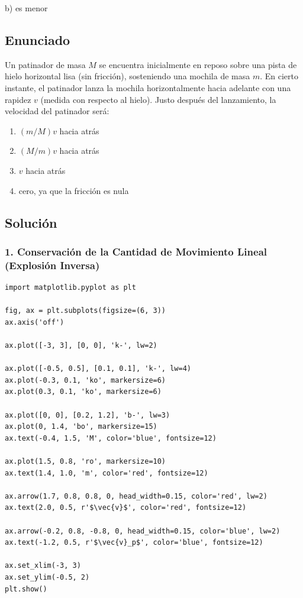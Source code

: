 \documentclass[12pt, a4paper]{article}
\begin{document}
\begin{tcolorbox}[colback=green!5!white, colframe=green!50!black, title=Respuesta Final]
\centering \Large b) es menor
\end{tcolorbox}

\newpage

\subsection*{Enunciado}
Un patinador de masa $M$ se encuentra inicialmente en reposo sobre una pista de hielo horizontal lisa (sin fricción), sosteniendo una mochila de masa $m$. En cierto instante, el patinador lanza la mochila horizontalmente hacia adelante con una rapidez $v$ (medida con respecto al hielo). Justo después del lanzamiento, la velocidad del patinador será:
\begin{enumerate}[label=\alph*)]
    \item $(m/M)v$ hacia atrás
    \item $(M/m)v$ hacia atrás
    \item $v$ hacia atrás
    \item cero, ya que la fricción es nula
\end{enumerate}

\subsection*{Solución}

\subsubsection*{1. Conservación de la Cantidad de Movimiento Lineal (Explosión Inversa)}

\begin{verbatim}
import matplotlib.pyplot as plt

fig, ax = plt.subplots(figsize=(6, 3))
ax.axis('off')

ax.plot([-3, 3], [0, 0], 'k-', lw=2)

ax.plot([-0.5, 0.5], [0.1, 0.1], 'k-', lw=4)
ax.plot(-0.3, 0.1, 'ko', markersize=6)
ax.plot(0.3, 0.1, 'ko', markersize=6)

ax.plot([0, 0], [0.2, 1.2], 'b-', lw=3)
ax.plot(0, 1.4, 'bo', markersize=15)
ax.text(-0.4, 1.5, 'M', color='blue', fontsize=12)

ax.plot(1.5, 0.8, 'ro', markersize=10)
ax.text(1.4, 1.0, 'm', color='red', fontsize=12)

ax.arrow(1.7, 0.8, 0.8, 0, head_width=0.15, color='red', lw=2)
ax.text(2.0, 0.5, r'$\vec{v}$', color='red', fontsize=12)

ax.arrow(-0.2, 0.8, -0.8, 0, head_width=0.15, color='blue', lw=2)
ax.text(-1.2, 0.5, r'$\vec{v}_p$', color='blue', fontsize=12)

ax.set_xlim(-3, 3)
ax.set_ylim(-0.5, 2)
plt.show()
\end{verbatim}
\end{document}
